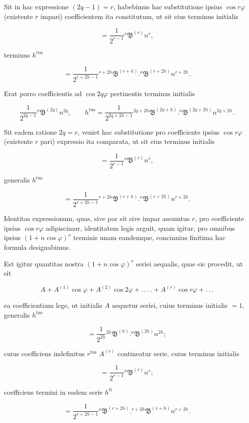 \par\noindent{}%
Sit in hac expressione $(2q-1) = r$, habebimus hac substitutione ipsius $\cos r\varphi$ (existente $r$ impari) coefficientem ita constitutum, ut sit eius terminus initialis

\[
= \frac{1}{2^{r-1}} {}^{\nu}\mathfrak{B}^{(r)} n^{r},
\]

\noindent terminus $h^{\text{tus}}$

\[
= \frac{1}{2^{r+2h-1}} {}^{r+2h}\mathfrak{B}^{(r+h)}  .  {}^{\nu}\mathfrak{B}^{(r+2h)} n^{r+2h}.
\]

\noindent Erat porro coefficientis ad $\cos 2q\varphi$ pertinentis terminus initialis

\[
\frac{1}{2^{2q-1}} {}^{\nu}\mathfrak{B}^{(2q)} n^{2q}, \qquad h^{\text{tus}} = \frac{1}{2^{2q+2h-1}} {}^{2q+2h}\mathfrak{B}^{(2q+h)}  .  {}^{\nu}\mathfrak{B}^{(2q+2h)} n^{2q+2h}.
\]

\noindent Sit eadem ratione $2q = r$, veniet hac substitutione pro coefficiente ipsius $\cos r\varphi$ (existente $r$ pari) expressio ita comparata, ut sit eius terminus initialis

\[
= \frac{1}{2^{r-1}} {}^{\nu}\mathfrak{B}^{(r)} n^{r},
\]

\noindent generalis $h^{\text{tus}}$

\[
= \frac{1}{2^{r+2h-1}} {}^{r+2h}\mathfrak{B}^{(r+h)}  .  {}^{\nu}\mathfrak{B}^{(r+2h)} n^{r+2h}.
\]

\noindent Identitas expressionum, quas, sive par sit sive impar assumtus $r$, pro coefficiente ipsius $\cos r\varphi$ adipiscimur, identitatem legis arguit, quam igitur, pro omnibus ipsius $(1+n\cos\varphi)^{\nu}$ terminis unam eandemque, concinnius finitima hac formula designabimus.

Est igitur quantitas nostra $(1+n\cos\varphi)^{\nu}$ seriei aequalis, quae sic procedit, ut sit

\[
A + A^{(1)}\cos\varphi + A^{(2)}\cos 2\varphi + .\,.\,.\,. + A^{(r)}\cos r\varphi + .\,.\,.
\]

\noindent ea coefficientium lege, ut initialis $A$ aequetur seriei, cuius terminus initialis $=1$, generalis $h^{\text{tus}}$

\[
= \frac{1}{2^{2h}} {}^{2h}\mathfrak{B}^{(h)}  .  {}^{\nu}\mathfrak{B}^{(2h)} n^{2h};
\]

\noindent cuius coefficiens indefinitus $r^{\text{tus}}$ $A^{(r)}$ contineatur serie, cuius terminus initialis

\[
= \frac{1}{2^{r-1}} {}^{\nu}\mathfrak{B}^{(r)} n^{r};
\]

\noindent coefficiens termini in eadem serie $h^{\text{ti}}$

\[
= \frac{1}{2^{r+2h-1}} {}^{\nu}\mathfrak{B}^{(r+2h)}  .  {}^{r+2h}\mathfrak{B}^{(r+h)} n^{r+2h}.
\]
